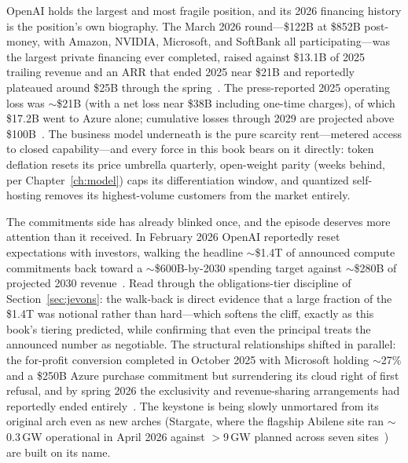 OpenAI holds the largest and most fragile position, and its 2026 financing history is the position's own biography. The March 2026 round---\$122B at \$852B post-money, with Amazon, NVIDIA, Microsoft, and SoftBank all participating---was the largest private financing ever completed, raised against \$13.1B of 2025 trailing revenue and an ARR that ended 2025 near \$21B and reportedly plateaued around \$25B through the spring~\cite{openai-valuation,openai-rev}. The press-reported 2025 operating loss was $\sim$\$21B (with a net loss near \$38B including one-time charges), of which \$17.2B went to Azure alone; cumulative losses through 2029 are projected above \$100B~\cite{openai-losses}. The business model underneath is the pure scarcity rent---metered access to closed capability---and every force in this book bears on it directly: token deflation resets its price umbrella quarterly, open-weight parity (weeks behind, per Chapter~\ref{ch:model}) caps its differentiation window, and quantized self-hosting removes its highest-volume customers from the market entirely.

The commitments side has already blinked once, and the episode deserves more attention than it received. In February 2026 OpenAI reportedly reset expectations with investors, walking the headline $\sim$\$1.4T of announced compute commitments back toward a $\sim$\$600B-by-2030 spending target against $\sim$\$280B of projected 2030 revenue~\cite{openai-reset}. Read through the obligations-tier discipline of Section~\ref{sec:jevons}: the walk-back is direct evidence that a large fraction of the \$1.4T was notional rather than hard---which softens the cliff, exactly as this book's tiering predicted, while confirming that even the principal treats the announced number as negotiable. The structural relationships shifted in parallel: the for-profit conversion completed in October 2025 with Microsoft holding $\sim$27\% and a \$250B Azure purchase commitment but surrendering its cloud right of first refusal, and by spring 2026 the exclusivity and revenue-sharing arrangements had reportedly ended entirely~\cite{openai-msft}. The keystone is being slowly unmortared from its original arch even as new arches (Stargate, where the flagship Abilene site ran $\sim$0.3\,GW operational in April 2026 against $>$9\,GW planned across seven sites~\cite{stargate-reality}) are built on its name.


